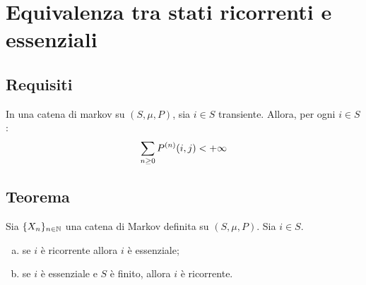 \section{Equivalenza tra stati ricorrenti e essenziali}


\subsection{Requisiti}
\begin{prop}\label{prop:sumtrans}
	In una catena di markov su $(S,\mu,P)$, sia $i\in S$ transiente. Allora, per ogni $i\in S$:
	\begin{equation*}
		\sum_{n\ge0}P^{(n)}(i,j)<+\infty
	\end{equation*}
\end{prop}


\subsection{Teorema}
\begin{thm}
	Sia $\{X_n\}_{n\in\mathbb N}$ una catena di Markov definita su $(S,\mu,P)$. Sia $i\in S$.
	\begin{enumerate}[(a)]
		\item \label{elem:ricess1} se $i$ è ricorrente allora $i$ è essenziale;
		\item \label{elem:ricess2} se $i$ è essenziale e $S$ è finito, allora $i$ è ricorrente.
	\end{enumerate}
\end{thm}
